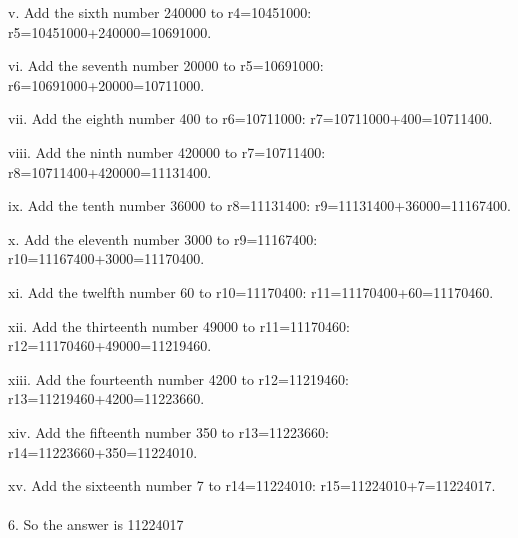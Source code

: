 \documentclass{article} \usepackage{arxiv}
\begin{document}
\begin{tcolorbox}[title = {Multiplication}, colback = Apricot!25!white, colframe = BrickRed!75!black,]
    \qquad v. Add the sixth number 240000 to r4=10451000: r5=10451000+240000=10691000. 
    
    \qquad vi. Add the seventh number 20000 to r5=10691000: r6=10691000+20000=10711000. 
    
    \qquad vii. Add the eighth number 400 to r6=10711000: r7=10711000+400=10711400. 
    
    \qquad viii. Add the ninth number 420000 to r7=10711400: r8=10711400+420000=11131400. 
    
    \qquad ix. Add the tenth number 36000 to r8=11131400: r9=11131400+36000=11167400. 
    
    \qquad x. Add the eleventh number 3000 to r9=11167400: r10=11167400+3000=11170400. 
    
    \qquad xi. Add the twelfth number 60 to r10=11170400: r11=11170400+60=11170460. 
    
    \qquad xii. Add the thirteenth number 49000 to r11=11170460: r12=11170460+49000=11219460. 
    
    \qquad xiii. Add the fourteenth number 4200 to r12=11219460: r13=11219460+4200=11223660. 
    
    \qquad xiv. Add the fifteenth number 350 to r13=11223660: r14=11223660+350=11224010.
    
    \qquad xv. Add the sixteenth number 7 to r14=11224010: r15=11224010+7=11224017. \\ \\
6. So the answer is 11224017 
\end{tcolorbox}
\noindent\begin{minipage}{\textwidth}
 \label{Tab:example_simple_mul_skill}
\end{minipage}

\newpage
\end{document}
